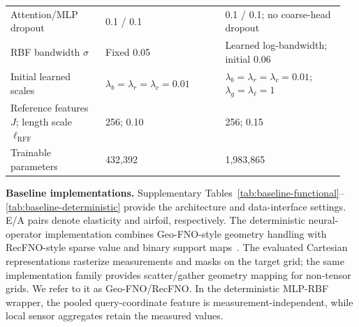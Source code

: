 \documentclass[11pt]{article}
\newcommand{\detail}[1]{\par\Needspace{4\baselineskip}\textbf{#1}\enspace}
\begin{document}
{\begin{longtable}{@{}P{0.27\linewidth} P{0.34\linewidth} P{0.34\linewidth}@{}}
Attention/MLP dropout & 0.1 / 0.1 & 0.1 / 0.1; no coarse-head dropout \\
RBF bandwidth $\sigma$ & Fixed 0.05 & Learned log-bandwidth; initial 0.06 \\
Initial learned scales & $\lambda_b=\lambda_r=\lambda_c=0.01$ & $\lambda_b=\lambda_r=\lambda_c=0.01$; $\lambda_g=\lambda_\ell=1$ \\
Reference features $J$; length scale $\ell_{\mathrm{RFF}}$ & 256; 0.10 & 256; 0.15 \\
Trainable parameters & 432,392 & 1,983,865 \\
\end{longtable}
}

\detail{Baseline implementations.} Supplementary Tables~\ref{tab:baseline-functional}--\ref{tab:baseline-deterministic} provide the architecture and data-interface settings. E/A pairs denote elasticity and airfoil, respectively. The deterministic neural-operator implementation combines Geo-FNO-style geometry handling with RecFNO-style sparse value and binary support maps~\cite{li2023geofno,zhao2023recfno}. The evaluated Cartesian representations rasterize measurements and masks on the target grid; the same implementation family provides scatter/gather geometry mapping for non-tensor grids. We refer to it as Geo-FNO/RecFNO. In the deterministic MLP-RBF wrapper, the pooled query-coordinate feature is measurement-independent, while local sensor aggregates retain the measured values.
\end{document}
